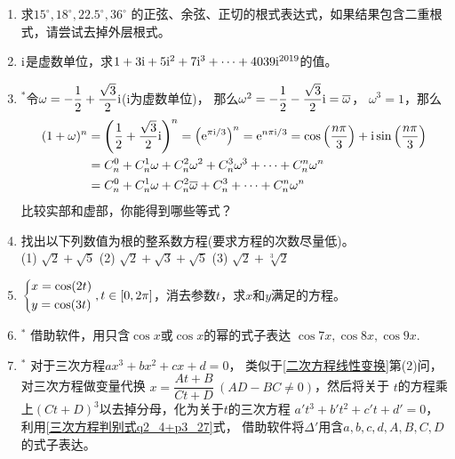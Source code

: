 \begin{enumerate}[label={\textbf{\thechapter.\arabic*}},leftmargin=
    \inteval{\myenumleftmargin}pt]
\item 求$ 15^{\circ},18^{\circ},22.5^{\circ},36^{\circ} $
的正弦、余弦、正切的根式表达式，如果结果包含二重根式，请尝试去掉外层根式。

\item $ \mathrm{i} $是虚数单位，求$ 1+3\mathrm{i}+5\mathrm{i}^2+7\mathrm{i}^3+\cdots +4039\mathrm{i}^{2019} $的值。

\item $^*$令$\omega=-\dfrac{1}{2}+\dfrac{\sqrt{3}}{2}\mathrm{i} $(i为虚数单位)，
那么$\omega^2=-\dfrac{1}{2}-\dfrac{\sqrt{3}}{2}\mathrm{i}=\overline{\omega}$，
$\omega^3=1$，那么
\begin{align*}
    (1+\omega)^n &=\left(\dfrac{1}{2}+\dfrac{\sqrt{3}}{2}\mathrm{i}\right)^n
    =\left(\mathrm{e}^{\pi\mathrm{i}/3}\right)^n=\mathrm{e}^{n\pi\mathrm{i}/3}=
    \cos\left(\dfrac{n\pi}{3}\right)+
    \mathrm{i}\sin\left(\dfrac{n\pi}{3}\right) \\
    &=C_n^0+C_n^1\omega+C_n^2\omega^2+C_n^3\omega^3+\cdots+C_n^n\omega^n \\
    &=C_n^0+C_n^1\omega+C_n^2\overline{\omega}+C_n^3+\cdots+C_n^n\omega^n
\end{align*}
比较实部和虚部，你能得到哪些等式？

\item 找出以下列数值为根的整系数方程(要求方程的次数尽量低)。\\
(1) $ \sqrt{2}+\sqrt{5} $ \quad 
(2) $ \sqrt{2}+\sqrt{3}+\sqrt{5} $ \quad 
(3) $ \sqrt{2}+\sqrt[3]{2} $ 

\item $ \begin{dcases}
    x=\cos(2t) \\
    y=\cos(3t) 
\end{dcases},t\in[0,2\pi] $，消去参数$t$，求$x$和$y$满足的方程。

\item$^*$  借助软件，用只含$ \cos x $或$ \cos x $的幂的式子表达
$ \cos 7x,\cos 8x,\cos 9x $. 

\item $^*$ 对于三次方程$ ax^3+bx^2+cx+d=0 $， 
类似于\ref{二次方程线性变换}第(2)问，对三次方程做变量代换
$x=\dfrac{At+B}{Ct+D}\ (AD-BC\neq 0)$，然后将关于
$t$的方程乘上$(Ct+D)^3$以去掉分母，化为关于$t$的三次方程
$a't^3+b't^2+c't+d'=0$，利用\eqref{三次方程判别式q2_4+p3_27}式，
借助软件将$\Delta'$用含$a,b,c,d,A,B,C,D$的式子表达。


\end{enumerate}
